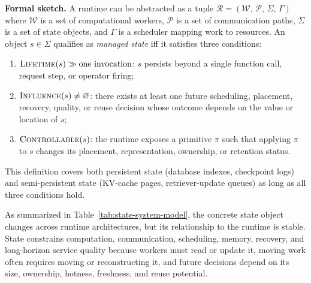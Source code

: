 \documentclass[manuscript]{acmart}
\begin{document}
\smallskip\noindent\textbf{Formal sketch.}
A runtime can be abstracted as a tuple \(\mathcal{R}=(\mathcal{W},\,\mathcal{P},\,\Sigma,\,\Gamma)\) where
\(\mathcal{W}\) is a set of computational workers,
\(\mathcal{P}\) is a set of communication paths,
\(\Sigma\) is a set of state objects, and
\(\Gamma\) is a scheduler mapping work to resources.
An object \(s\in\Sigma\) qualifies as \emph{managed state} iff it satisfies three conditions:
\begin{enumerate}[leftmargin=*,nosep]
\item \(\textsc{Lifetime}(s)\gg\text{one invocation}\): \(s\) persists beyond a single function call, request step, or operator firing;
\item \(\textsc{Influence}(s)\neq\varnothing\): there exists at least one future scheduling, placement, recovery, quality, or reuse decision whose outcome depends on the value or location of \(s\);
\item \(\textsc{Controllable}(s)\): the runtime exposes a primitive \(\pi\) such that applying \(\pi\) to \(s\) changes its placement, representation, ownership, or retention status.
\end{enumerate}
This definition covers both persistent state (database indexes, checkpoint logs) and semi-persistent state (KV-cache pages, retriever-update queues) as long as all three conditions hold.

As summarized in Table~\ref{tab:state-system-model}, the concrete state object changes across runtime architectures, but its relationship to the runtime is stable. State constrains computation, communication, scheduling, memory, recovery, and long-horizon service quality because workers must read or update it, moving work often requires moving or reconstructing it, and future decisions depend on its size, ownership, hotness, freshness, and reuse potential.
\end{document}
